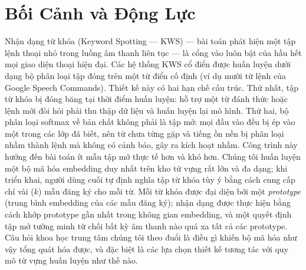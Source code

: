 \documentclass[12pt,a4paper]{report}
\begin{document}
\section{Bối Cảnh và Động Lực}\label{sec:context}

Nhận dạng từ khóa (Keyword Spotting --- KWS) --- bài toán phát hiện một tập lệnh
thoại nhỏ trong luồng âm thanh liên tục --- là cổng vào luôn bật của hầu hết mọi
giao diện thoại hiện đại. Các hệ thống KWS cổ điển được huấn luyện dưới dạng bộ
phân loại tập đóng trên một từ điển cố định (ví dụ mười từ lệnh của Google Speech
Commands). Thiết kế này có hai hạn chế cấu trúc. Thứ nhất, tập từ khóa bị đóng
băng tại thời điểm huấn luyện: hỗ trợ một từ đánh thức hoặc lệnh mới đòi hỏi
phải thu thập dữ liệu và huấn luyện lại mô hình. Thứ hai, bộ phân loại softmax
về bản chất không phải là tập mở: mọi đầu vào đều bị ép vào một trong các lớp đã
biết, nên từ chưa từng gặp và tiếng ồn nền bị phân loại nhầm thành lệnh mà không
có cảnh báo, gây ra kích hoạt nhầm. Công trình này hướng đến bài toán ít mẫu tập
mở thực tế hơn và khó hơn. Chúng tôi huấn luyện một bộ mã hóa embedding duy nhất
trên kho từ vựng rất lớn và đa dạng; khi triển khai, người dùng cuối tự định
nghĩa tập từ khóa tùy ý bằng cách cung cấp chỉ vài ($k$) mẫu đăng ký cho mỗi
từ. Mỗi từ khóa được đại diện bởi một \emph{prototype} (trung bình embedding của
các mẫu đăng ký); nhận dạng được thực hiện bằng cách khớp prototype gần nhất
trong không gian embedding, và một quyết định tập mở tường minh từ chối bất kỳ
âm thanh nào quá xa tất cả các prototype. Câu hỏi khoa học trung tâm chúng tôi
theo đuổi là điều gì khiến bộ mã hóa như vậy tổng quát hóa được, và đặc biệt là
các lựa chọn thiết kế tương tác với quy mô từ vựng huấn luyện như thế nào.
\end{document}
